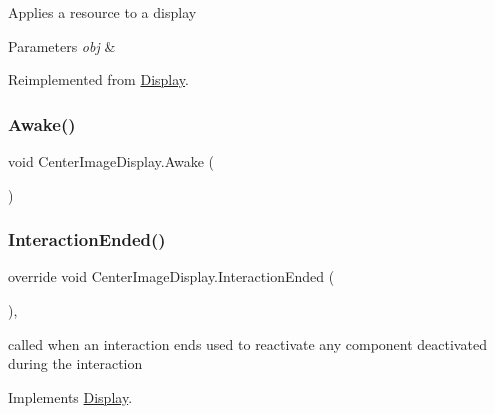 Applies a resource to a display 


\begin{DoxyParams}{Parameters}
{\em obj} & \\
\hline
\end{DoxyParams}


Reimplemented from \mbox{\hyperlink{class_display_aa1d23e0e870c59c63e2f040e84ef0121}{Display}}.

\mbox{\label{class_center_image_display_a413c4767daa6cca041577ba63eb3b8d5}} 
\subsubsection{\texorpdfstring{Awake()}{Awake()}}
{\footnotesize\ttfamily void Center\+Image\+Display.\+Awake (\begin{DoxyParamCaption}{ }\end{DoxyParamCaption})\hspace{0.3cm}{\ttfamily [private]}}

\mbox{\label{class_center_image_display_ac78f5ea36aa445bb3d12124f1baf814d}} 
\subsubsection{\texorpdfstring{Interaction\+Ended()}{InteractionEnded()}}
{\footnotesize\ttfamily override void Center\+Image\+Display.\+Interaction\+Ended (\begin{DoxyParamCaption}{ }\end{DoxyParamCaption})\hspace{0.3cm}{\ttfamily [protected]}, {\ttfamily [virtual]}}



called when an interaction ends used to reactivate any component deactivated during the interaction 



Implements \mbox{\hyperlink{class_display_a6fd38485267e1b78f1d1dfb589ec4ae0}{Display}}.

\mbox{\label{class_center_image_display_a2944541a38bcc65b7fff15200c9f0fc3}} 

